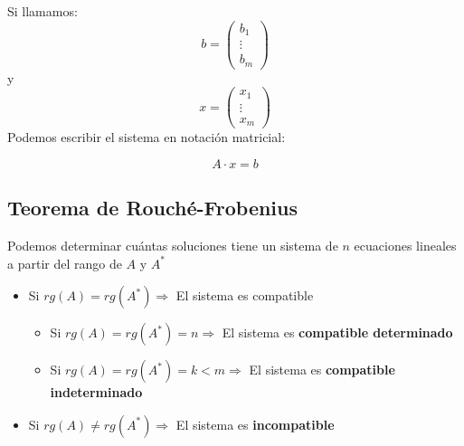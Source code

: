 Si llamamos:
$${\displaystyle b={\begin{pmatrix}b_{1}\\\vdots \\b_{m}\end{pmatrix}}}$$ y $${\displaystyle x={\begin{pmatrix}x_{1}\\\vdots \\x_{m}\end{pmatrix}}}$$
Podemos escribir el sistema en notación matricial:

$$A \cdot x = b$$

\subsection{Teorema de Rouché-Frobenius}

Podemos determinar cuántas soluciones tiene un sistema de $n$ ecuaciones lineales a partir del rango de $A$ y $A^*$
\begin{itemize}
    \item Si $rg(A)=rg(A^*) \Rightarrow$ El sistema es compatible
    \begin{itemize}
        \item Si $rg(A)=rg(A^*)=n \Rightarrow$ El sistema es \textbf{compatible determinado}
        \item Si $rg(A)=rg(A^*)=k<m \Rightarrow$ El sistema es \textbf{compatible indeterminado}
        
    \end{itemize}
    \item Si $rg(A)\neq rg(A^*) \Rightarrow$ El sistema es \textbf{incompatible}
\end{itemize}
 
